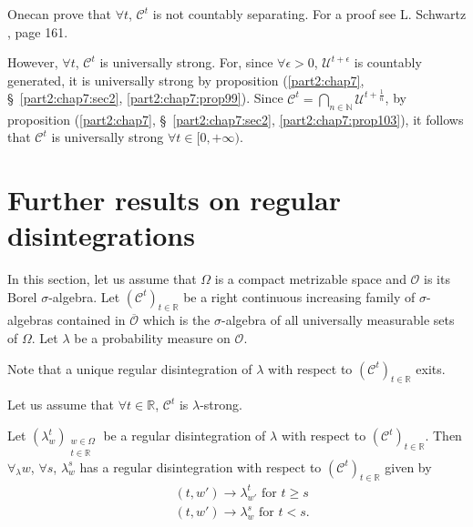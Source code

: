 One\pageoriginale can prove that $\forall t$, $\mathscr{C}^t$ is not
countably separating. For a proof see L. Schwartz \cite{key1}, page
161.

However, $\forall t$, $\mathscr{C}^t$ is universally strong. For,
since $\forall \epsilon >0$, $\mathcal{U}^{t+\epsilon}$ is countably
generated, it is universally strong by proposition (\ref{part2:chap7},
\S\ \ref{part2:chap7:sec2}, \ref{part2:chap7:prop99}). Since
$\mathscr{C}^t = \bigcap\limits_{n \in \mathbb{N}} 
\mathcal{U}^{t+\frac{1}{n}}$, by proposition (\ref{part2:chap7},
\S\ \ref{part2:chap7:sec2}, \ref{part2:chap7:prop103}), it 
follows that $\mathscr{C}^t$ is universally strong $\forall t \in
[0,+\infty)$.

\section{Further results on regular disintegrations }\label{part2:chap7:sec5}

In this section, let us assume that $\Omega$ is a compact metrizable
space and $\mathscr{O}$ is its Borel $\sigma$-algebra. Let
$(\mathscr{C}^t)_{t \in \mathbb{R}}$ be a right continuous increasing
family of $\sigma$-algebras contained in $\overline{\mathscr{O}}$
which is the $\sigma$-algebra of all universally measurable sets of
$\Omega$. Let $\lambda$ be a probability measure on $\mathscr{O}$. 

Note that a unique regular disintegration of $\lambda$ with respect
to $(\mathscr{C}^t)_{t\in \mathbb{R}}$ exits.

Let us assume that $\forall t \in \mathbb{R}$, $\mathscr{C}^t$ is
$\lambda$-strong. 

\begin{thm}\label{part2:chap7:thm111}
Let $(\lambda^t_w)_{\substack{w \in \Omega\\t \in \mathbb{R}}}$ be a
regular disintegration of $\lambda$ with respect to
$(\mathscr{C}^t)_{t \in \mathbb{R}}$. Then $\forall_\lambda w$,
$\forall s$, $\lambda^s_w$ has a regular disintegration with respect
to $(\mathscr{C}^t)_{t \in \mathbb{R}}$ given by 
\begin{align*}
& (t,w') \to \lambda^t_{w'} \text{ for } t \geq s\\
& (t,w') \to \lambda^s_w \text{ for } t < s.
\end{align*}
\end{thm}

